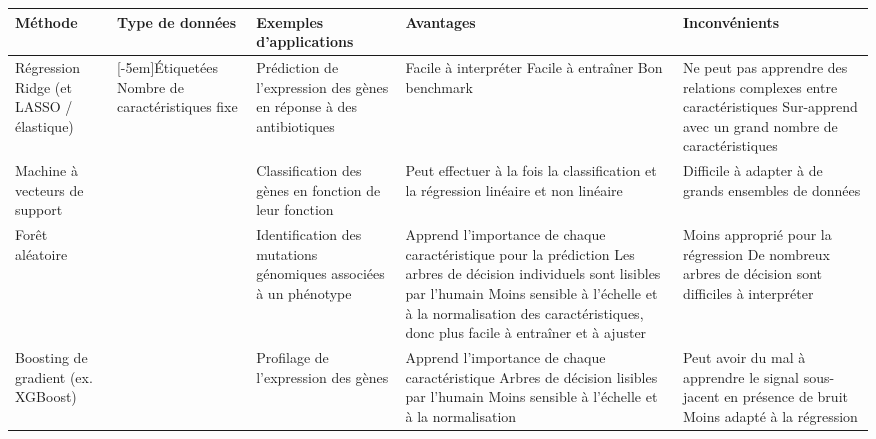 \begin{table}[htbp]
    \centering
    \small
    \begin{sideways}
    \begin{tabular}{|>{\raggedright\arraybackslash}p{0.1\textheight}|>{\raggedright\arraybackslash}p{0.1\textheight}|>{\raggedright\arraybackslash}p{0.15\textheight}|>{\raggedright\arraybackslash}p{0.275\textheight}|>{\raggedright\arraybackslash}p{0.275\textheight}|}
    \hline
    \textbf{Méthode} & \textbf{Type de données} & \textbf{Exemples d'applications} & \textbf{Avantages} & \textbf{Inconvénients} \\
    \hline
    Régression Ridge (et LASSO / élastique) & \multirow{5}{0.1\textheight}[-5em]{Étiquetées Nombre de caractéristiques fixe} & Prédiction de l'expression des gènes en réponse à des antibiotiques & Facile à interpréter \newline Facile à entraîner \newline Bon benchmark & Ne peut pas apprendre des relations complexes entre caractéristiques \newline Sur-apprend avec un grand nombre de caractéristiques \\
    \cline{1-1}\cline{3-5}
    Machine à vecteurs de support & & Classification des gènes en fonction de leur fonction & Peut effectuer à la fois la classification et la régression linéaire et non linéaire & Difficile à adapter à de grands ensembles de données \\    
    \cline{1-1}\cline{3-5}
    Forêt aléatoire &  & Identification des mutations génomiques associées à un phénotype & Apprend l'importance de chaque caractéristique pour la prédiction \newline Les arbres de décision individuels sont lisibles par l'humain \newline Moins sensible à l'échelle et à la normalisation des caractéristiques, donc plus facile à entraîner et à ajuster & Moins approprié pour la régression \newline De nombreux arbres de décision sont difficiles à interpréter \\     
    \cline{1-1}\cline{3-5}
    Boosting de gradient (ex. XGBoost) & & Profilage de l'expression des gènes & Apprend l'importance de chaque caractéristique \newline Arbres de décision lisibles par l'humain Moins sensible à l'échelle et à la normalisation & Peut avoir du mal à apprendre le signal sous-jacent en présence de bruit Moins adapté à la régression \\

\end{tabular}
\end{sideways}
\end{table}
